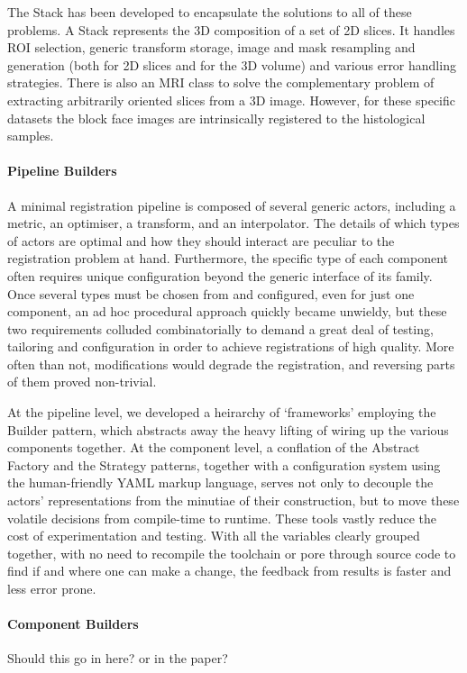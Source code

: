         The Stack has been developed to encapsulate the solutions to all of these problems. A Stack represents the 3D composition of a set of 2D slices. It handles ROI selection, generic transform storage, image and mask resampling and generation (both for 2D slices and for the 3D volume) and various error handling strategies. There is also an MRI class to solve the complementary problem of extracting arbitrarily oriented slices from a 3D image. However, for these specific datasets the block face images are intrinsically registered to the histological samples.
  
      \paragraph{Pipeline Builders}
        A minimal registration pipeline is composed of several generic actors, including a metric, an optimiser, a transform, and an interpolator. The details of which types of actors are optimal and how they should interact are peculiar to the registration problem at hand. Furthermore, the specific type of each component often requires unique configuration beyond the generic interface of its family. Once several types must be chosen from and configured, even for just one component, an ad hoc procedural approach quickly became unwieldy, but these two requirements colluded combinatorially to demand a great deal of testing, tailoring and configuration in order to achieve registrations of high quality. More often than not, modifications would degrade the registration, and reversing parts of them proved non-trivial.

        At the pipeline level, we developed a heirarchy of `frameworks' employing the Builder pattern, which abstracts away the heavy lifting of wiring up the various components together.  At the component level, a conflation of the Abstract Factory and the Strategy patterns, together with a configuration system using the human-friendly YAML markup language, serves not only to decouple the actors' representations from the minutiae of their construction, but to move these volatile decisions from compile-time to runtime. These tools vastly reduce the cost of experimentation and testing. With all the variables clearly grouped together, with no need to recompile the toolchain or pore through source code to find if and where one can make a change, the feedback from results is faster and less error prone.
      
      \paragraph{Component Builders}
      Should this go in here? or in the paper?
      
